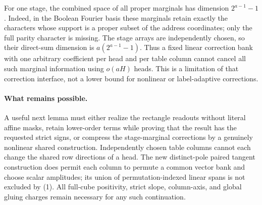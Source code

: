 \documentclass[11pt]{article}
\begin{document}
For one stage, the combined space of all proper marginals has dimension
$2^{a-1}-1$. Indeed, in the Boolean Fourier basis these marginals retain
exactly the characters whose support is a proper subset of the address
coordinates; only the full parity character is missing. The stage arrays
are independently chosen, so their direct-sum dimension is
$a(2^{a-1}-1)$. Thus a fixed linear correction bank with one arbitrary
coefficient per head and per table column cannot cancel all such marginal
information using $o(aH)$ heads. This is a limitation of that correction
interface, not a lower bound for nonlinear or label-adaptive corrections.

\paragraph{What remains possible.}
A useful next lemma must either realize the rectangle readouts without
literal affine masks, retain lower-order terms while proving that the
result has the requested strict signs, or compress the stage-marginal
corrections by a genuinely nonlinear shared construction. Independently
chosen table columns cannot each change the shared row directions of a
head. The new distinct-pole paired tangent construction does permit each
column to permute a common vector bank and choose scalar amplitudes;
its union of permutation-indexed linear spans is not excluded by (1).
All full-cube positivity, strict slope, column-axis, and global gluing
charges remain necessary for any such continuation.
\end{document}
